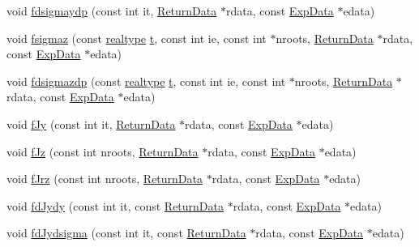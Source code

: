 \begin{DoxyCompactItemize}
\item 
void \mbox{\hyperlink{classamici_1_1_model_acd0838d3644e9232cc2e65d7a8c956cf}{fdsigmaydp}} (const int it, \mbox{\hyperlink{classamici_1_1_return_data}{Return\+Data}} $\ast$rdata, const \mbox{\hyperlink{classamici_1_1_exp_data}{Exp\+Data}} $\ast$edata)
\item 
void \mbox{\hyperlink{classamici_1_1_model_a55798a44d65a15c907e74f4738efb994}{fsigmaz}} (const \mbox{\hyperlink{namespaceamici_a1bdce28051d6a53868f7ccbf5f2c14a3}{realtype}} \mbox{\hyperlink{classamici_1_1_model_a711281d57e9710226face29151cc4641}{t}}, const int ie, const int $\ast$nroots, \mbox{\hyperlink{classamici_1_1_return_data}{Return\+Data}} $\ast$rdata, const \mbox{\hyperlink{classamici_1_1_exp_data}{Exp\+Data}} $\ast$edata)
\item 
void \mbox{\hyperlink{classamici_1_1_model_a0c9fd2d7e184d44745130d7ffa2a0075}{fdsigmazdp}} (const \mbox{\hyperlink{namespaceamici_a1bdce28051d6a53868f7ccbf5f2c14a3}{realtype}} \mbox{\hyperlink{classamici_1_1_model_a711281d57e9710226face29151cc4641}{t}}, const int ie, const int $\ast$nroots, \mbox{\hyperlink{classamici_1_1_return_data}{Return\+Data}} $\ast$rdata, const \mbox{\hyperlink{classamici_1_1_exp_data}{Exp\+Data}} $\ast$edata)
\item 
void \mbox{\hyperlink{classamici_1_1_model_ad8fd49506b1d288ded2c036318f3ca51}{f\+Jy}} (const int it, \mbox{\hyperlink{classamici_1_1_return_data}{Return\+Data}} $\ast$rdata, const \mbox{\hyperlink{classamici_1_1_exp_data}{Exp\+Data}} $\ast$edata)
\item 
void \mbox{\hyperlink{classamici_1_1_model_a00e31d4a939e96476f2dc67bc930054c}{f\+Jz}} (const int nroots, \mbox{\hyperlink{classamici_1_1_return_data}{Return\+Data}} $\ast$rdata, const \mbox{\hyperlink{classamici_1_1_exp_data}{Exp\+Data}} $\ast$edata)
\item 
void \mbox{\hyperlink{classamici_1_1_model_a82a8b0d0b20ab474f48e98776b6cb791}{f\+Jrz}} (const int nroots, \mbox{\hyperlink{classamici_1_1_return_data}{Return\+Data}} $\ast$rdata, const \mbox{\hyperlink{classamici_1_1_exp_data}{Exp\+Data}} $\ast$edata)
\item 
void \mbox{\hyperlink{classamici_1_1_model_a182dd2b4c7ad2fcfdc1987e0dfb8d5a4}{fd\+Jydy}} (const int it, const \mbox{\hyperlink{classamici_1_1_return_data}{Return\+Data}} $\ast$rdata, const \mbox{\hyperlink{classamici_1_1_exp_data}{Exp\+Data}} $\ast$edata)
\item 
void \mbox{\hyperlink{classamici_1_1_model_aa683851edd9a578fda8e3f29465c313f}{fd\+Jydsigma}} (const int it, const \mbox{\hyperlink{classamici_1_1_return_data}{Return\+Data}} $\ast$rdata, const \mbox{\hyperlink{classamici_1_1_exp_data}{Exp\+Data}} $\ast$edata)

\end{DoxyCompactItemize}

